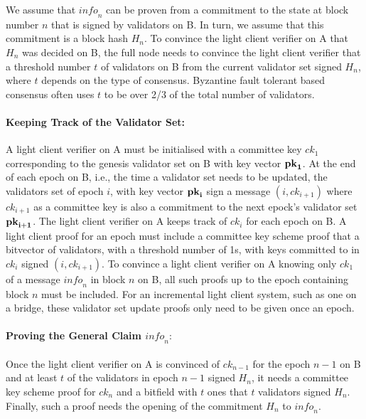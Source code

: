 We assume that $\mathit{info}_n$ can be proven from a commitment to the state at block number $n$ that is signed by validators on B. 
In turn, we assume that this commitment is a block hash $H_n$. To convince the light client verifier on A that $H_n$ was decided on B, 
the full node needs to convince the light client verifier that a threshold number $t$ of validators on B from the current validator set 
signed $H_n$, where $t$ depends on the type of consensus. Byzantine fault tolerant based consensus often uses $t$ to be 
over 2/3 of the total number of validators.

\noindent\paragraph{Keeping Track of the Validator Set:} A light client verifier on A must be initialised with a committee key $\mathit{ck}_1$ corresponding to the genesis validator set on B with key vector $\bf{pk}_1$. At the end of each epoch on B, i.e., the time a validator set needs to be updated, the validators set of epoch $i$, with key vector $\bf{pk}_i$ sign a message $(i,\mathit{ck}_{i+1})$ where $\mathit{ck}_{i+1}$ as a committee key is also a commitment to the next epock's validator set $\bf{pk}_{i+1}$. The light client verifier on A 
keeps track of $\mathit{ck}_i$ for each epoch on B. A light client proof for an epoch must include a committee key scheme proof 
that a bitvector of validators, with a threshold number of 1s, with keys committed to in $\mathit{ck}_i$ signed $(i,\mathit{ck}_{i+1})$. 
To convince a light client verifier on A knowing only $\mathit{ck}_1$ of a message $\mathit{info}_n$ in block $n$ on B, 
all such proofs up to the epoch containing block $n$ must be included. For an incremental light client system, such as one on a 
bridge, these validator set update proofs only need to be given once an epoch.
\vspace{-0.05in}

\noindent\paragraph{Proving the General Claim $\mathit{info}_n:$} Once the light client verifier on A is convinced of $\mathit{ck}_{n-1}$ 
for the epoch $n-1$ on B and at least $t$ of the validators in epoch $n-1$ signed $H_n$, it needs a committee key scheme proof for 
$\mathit{ck}_n$ and a bitfield with $t$ ones that $t$ validators signed $H_n$. Finally, such a proof needs the opening of the 
commitment $H_n$ to $\mathit{info}_n$.
\vspace{-0.08in}

